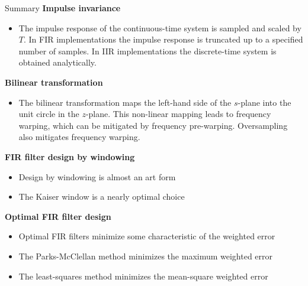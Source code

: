 \documentclass[10pt, handout]{beamer}
\begin{document}
%
\begin{frame}{Summary}
	\textbf{Impulse invariance}
	\begin{itemize}
		\item The impulse response of the continuous-time system is sampled and scaled by $T$. In FIR implementations the impulse response is truncated up to a specified number of samples. In IIR implementations the discrete-time system is obtained analytically.
	\end{itemize}
	
	\textbf{Bilinear transformation}
	\begin{itemize}
		\item The bilinear transformation maps the left-hand side of the $s$-plane into the unit circle in the $z$-plane. This non-linear mapping leads to frequency warping, which can be mitigated by frequency pre-warping. Oversampling also mitigates frequency warping.
	\end{itemize}
	
	\textbf{FIR filter design by windowing}
	\begin{itemize}
		\item Design by windowing is almost an art form
		\item The Kaiser window is a nearly optimal choice
	\end{itemize}

	\textbf{Optimal FIR filter design}
	\begin{itemize}
		\item Optimal FIR filters minimize some characteristic of the weighted error
		\item The Parks-McClellan method minimizes the maximum weighted error
		\item The least-squares method minimizes the mean-square weighted error
	\end{itemize}	
\end{frame}
\end{document}
